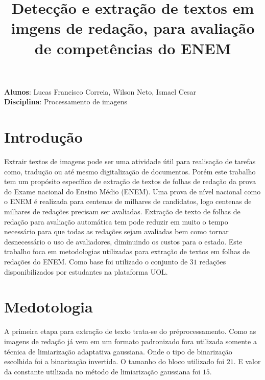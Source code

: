 \documentclass[12pt,a4]{article}
\title{Detecção e extração de textos em imgens de redação, para avaliação de competências do ENEM}
\date{}
\begin{document}
\begin{titlepage}
\begin{center}
\maketitle
\textbf{Alunos}: Lucas Francisco Correia, Wilson Neto,  Ismael Cesar \\
\textbf{Disciplina}: Processamento de imagens
\end{center}
\end{titlepage}

\section{Introdução}
\label{sec:introdcao}
	Extrair textos de imagens pode ser uma atividade útil para realisação de tarefas como, tradução ou até mesmo digitalização de documentos.
	Porém este trabalho tem um propósito específico de extração de textos de folhas de redação da prova do Exame nacional do Ensino Médio (ENEM).
	Uma prova de nível nacional como o ENEM é realizada para centenas de milhares de candidatos, logo centenas de milhares de redações precisam ser avaliadas.
	Extração de texto de folhas de redação para avaliação automática tem pode reduzir em muito o tempo necessário para que todas as redações sejam avaliadas bem como tornar desnecessário o uso de avaliadores, diminuindo os custos para o estado. 
	Este trabalho foca em metodologias utilizadas para extração de textos em folhas de redações do ENEM.
	Como base foi utilizado o conjunto de $31$ redações disponibilizados por estudantes na plataforma UOL. 
	

\section{Medotologia}
\label{sec:metodologia}
	A primeira etapa para extração de texto trata-se do préprocessamento. 
	Como as imagens de redação já vem em um formato padronizado fora utilizada somente a técnica de limiarização adaptativa gaussiana. 
	Onde o tipo de binarização escolhida foi a binarização invertida. 
	O tamanho do bloco utilizado foi $21$.
	E valor da constante utilizada no método de limiarização gaussiana foi $15$.


\end{document}
